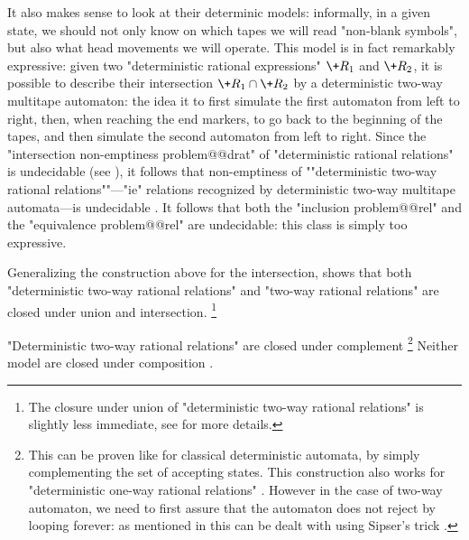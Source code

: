 It also makes sense to look at their determinic models: informally, in a given state, we
should not only know on which tapes we will read "non-blank symbols",
but also what head movements we will operate.
This model is in fact remarkably expressive: given two "deterministic rational expressions"
$\+R_1$ and $\+R_2$, it is possible to describe their intersection $\+R_1 \cap \+R_2$
by a deterministic two-way multitape automaton: the idea it to first simulate the first automaton
from left to right, then, when reaching the end markers, to go back to the beginning of the tapes,
and then simulate the second automaton from left to right.
Since the "intersection non-emptiness problem@@drat"
of "deterministic rational relations" is undecidable (see ),
it follows that non-emptiness of \AP""deterministic two-way rational relations""---"ie"
relations recognized by deterministic two-way multitape automata---is undecidable
\cite[Theorem~19]{RabinScott1959FiniteAutomata}.
It follows that both the "inclusion problem@@rel" and the "equivalence problem@@rel" are
undecidable: this class is simply too expressive.

Generalizing the construction above for the intersection, shows that
both "deterministic two-way rational relations" and "two-way rational relations"
are closed under union and intersection.%
\footnote{The closure under union of "deterministic two-way rational relations"
is slightly less immediate, see \cite[Lemma~4]{CartonExibardSerre2017TwoWayTwoTapeAutomata}
for more details.}

"Deterministic two-way rational relations" are closed under complement%
\footnote{This can be proven like for classical deterministic automata, by simply complementing
the set of accepting states. This construction also works
for "deterministic one-way rational relations" \cite[Theorem~17]{RabinScott1959FiniteAutomata}.
However in the case of two-way automaton,
we need to first assure that the automaton does not reject by looping
forever: as mentioned in \cite[Lemma~4]{CartonExibardSerre2017TwoWayTwoTapeAutomata}
this can be dealt with using Sipser's trick \cite[Theorem~1]{Sipser1980HaltingSpaceBoundedComputations}.}
Neither model are closed under composition \cite[Theorem~5]{CartonExibardSerre2017TwoWayTwoTapeAutomata}.

